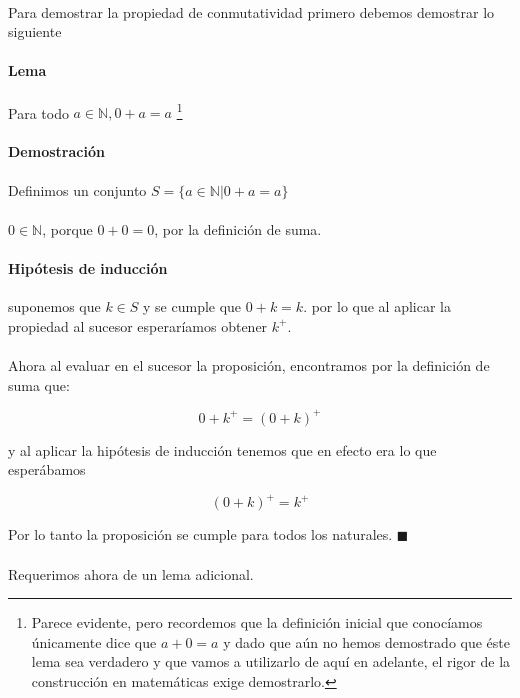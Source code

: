 \documentclass{article}
\begin{document}
\paragraph{} Para demostrar la propiedad de conmutatividad primero debemos demostrar lo siguiente

\paragraph{Lema} Para todo $a \in \mathbb{N}, 0 + a = a$ \footnote{Parece evidente, pero recordemos que la definición inicial que conocíamos únicamente dice que $a + 0 = a$ y dado que aún no hemos demostrado que éste lema sea verdadero y que vamos a utilizarlo de aquí en adelante, el rigor de la construcción en matemáticas exige demostrarlo.}

\paragraph{Demostración} Definimos un conjunto $S = \{a \in \mathbb{N}| 0 + a = a \}$

\paragraph{} $0 \in \mathbb{N}$, porque $0 + 0 = 0$, por la definición de suma.

\paragraph{Hipótesis de inducción} suponemos que $k \in S$ y se cumple que $0 + k = k$. por lo que al aplicar la propiedad al sucesor esperaríamos obtener $k^+$.

\paragraph{}Ahora al evaluar en el sucesor la proposición, encontramos por la definición de suma que:

$$ 0 + k^+ = (0 + k)^+$$

y al aplicar la hipótesis de inducción tenemos que en efecto era lo que esperábamos

$$(0 + k)^+ = k^+$$

Por lo tanto la proposición se cumple para todos los naturales. $\blacksquare$

\paragraph{} Requerimos ahora de un lema adicional.
\end{document}
